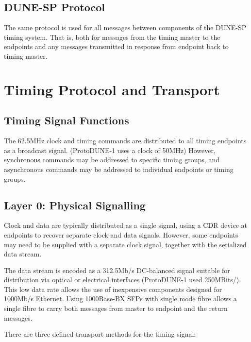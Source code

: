\documentclass[a4paper,11pt]{article}
\begin{document}
\subsection{DUNE-SP Protocol}

The same protocol is used for all messages between components of the DUNE-SP timing system. That is, both for messages from the timing master to the endpoints and any messages transmitted in response from endpoint back to timing master.



\section{Timing Protocol and Transport}

\subsection{Timing Signal Functions}

The 62.5MHz clock and timing commands are distributed to all timing endpoints as a broadcast signal. (ProtoDUNE-1 uses a clock of 50MHz) However, synchronous commands may be addressed to specific timing groups, and asynchronous commands may be addressed to individual endpoints or timing groups.



\subsection{Layer 0: Physical Signalling}

Clock and data are typically distributed as a single signal, using a CDR device at endpoints to recover separate clock and data signals. However, some endpoints may need to be supplied with a separate clock signal, together with the serialized data stream. 

The data stream is encoded as a 312.5Mb/s DC-balanced signal suitable for distribution via optical or electrical interfaces (ProtoDUNE-1 used 250MBits/). This low data rate allows the use of inexpensive components designed for 1000Mb/s Ethernet. Using 1000Base-BX SFPs with single mode fibre allows a single fibre to carry both messages from master to endpoint and the return messages.

There are three defined transport methods for the timing signal:
\end{document}
